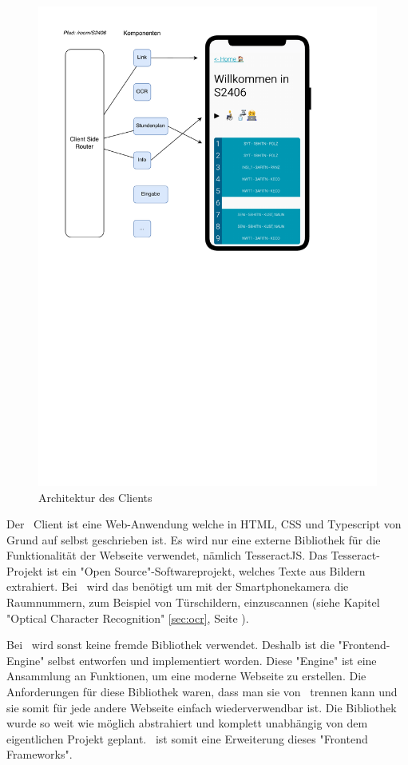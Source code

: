 
\begin{figure}[H]
    \centering
    \includegraphics[width=120mm]{media/Intro/client_arch.svg.pdf}
    \caption{Architektur des Clients}
\end{figure}

Der \ZELIA\ Client ist eine Web-Anwendung welche in HTML, CSS und Typescript von Grund auf selbst geschrieben ist. Es wird nur eine externe Bibliothek für die Funktionalität der Webseite verwendet, nämlich TesseractJS. Das Tesseract-Projekt ist ein "Open Source"-Softwareprojekt, welches Texte aus Bildern extrahiert. Bei \ZELIA\ wird das benötigt um mit der Smartphonekamera die Raumnummern, zum Beispiel von Türschildern, einzuscannen (siehe Kapitel "Optical Character Recognition" \ref{sec:ocr}, Seite \pageref{sec:ocr}).

Bei \ZELIA\ wird sonst keine fremde Bibliothek verwendet. Deshalb ist die "Frontend-Engine" selbst entworfen und implementiert worden. Diese "Engine" ist eine Ansammlung an Funktionen, um eine moderne Webseite zu erstellen. Die Anforderungen für diese Bibliothek waren, dass man sie von \ZELIA\ trennen kann und sie somit für jede andere Webseite einfach wiederverwendbar ist. Die Bibliothek wurde so weit wie möglich abstrahiert und komplett unabhängig von dem eigentlichen Projekt geplant. \ZELIA\ ist somit eine Erweiterung dieses "Frontend Frameworks".

